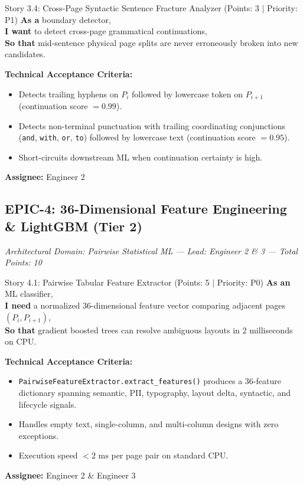 \documentclass[11pt,a4paper]{article}
\begin{document}
\begin{storybox}{Story 3.4: Cross-Page Syntactic Sentence Fracture Analyzer (Points: 3 $|$ Priority: P1)}
\textbf{As a} boundary detector, \\
\textbf{I want} to detect cross-page grammatical continuations, \\
\textbf{So that} mid-sentence physical page splits are never erroneously broken into new candidates.

\vspace{0.3em}
\textbf{Technical Acceptance Criteria:}
\begin{itemize}[leftmargin=1.2em, itemsep=1pt]
    \item Detects trailing hyphens on $P_i$ followed by lowercase token on $P_{i+1}$ (continuation score $= 0.99$).
    \item Detects non-terminal punctuation with trailing coordinating conjunctions (\texttt{and}, \texttt{with}, \texttt{or}, \texttt{to}) followed by lowercase text (continuation score $= 0.95$).
    \item Short-circuits downstream ML when continuation certainty is high.
\end{itemize}
\textbf{Assignee:} Engineer 2
\end{storybox}

\clearpage

\subsection{EPIC-4: 36-Dimensional Feature Engineering \& LightGBM (Tier 2)}
\textit{Architectural Domain: Pairwise Statistical ML --- Lead: Engineer 2 \& 3 --- Total Points: 10}

\vspace{0.5em}

\begin{storybox}{Story 4.1: Pairwise Tabular Feature Extractor (Points: 5 $|$ Priority: P0)}
\textbf{As an} ML classifier, \\
\textbf{I need} a normalized 36-dimensional feature vector comparing adjacent pages $(P_i, P_{i+1})$, \\
\textbf{So that} gradient boosted trees can resolve ambiguous layouts in 2 milliseconds on CPU.

\vspace{0.3em}
\textbf{Technical Acceptance Criteria:}
\begin{itemize}[leftmargin=1.2em, itemsep=1pt]
    \item \texttt{PairwiseFeatureExtractor.extract\_features()} produces a 36-feature dictionary spanning semantic, PII, typography, layout delta, syntactic, and lifecycle signals.
    \item Handles empty text, single-column, and multi-column designs with zero exceptions.
    \item Execution speed $<2\text{ ms}$ per page pair on standard CPU.
\end{itemize}
\textbf{Assignee:} Engineer 2 \& Engineer 3
\end{storybox}
\end{document}
